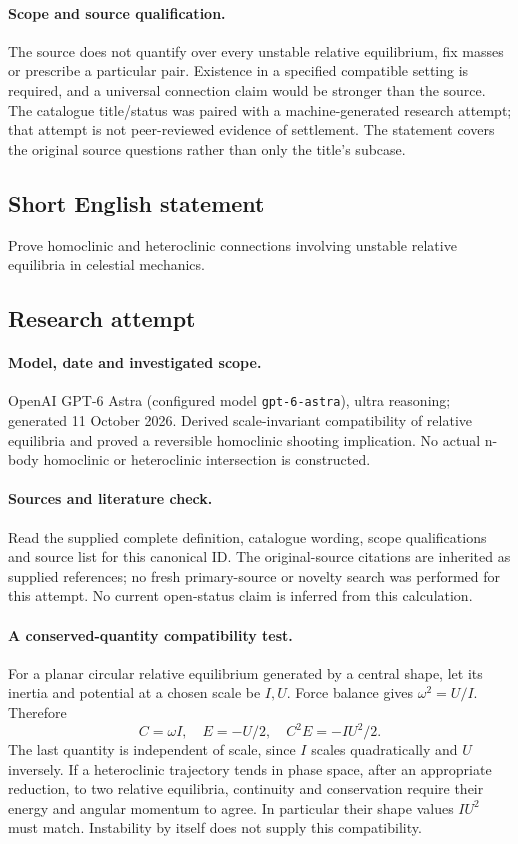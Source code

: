 \documentclass[11pt]{article}
\begin{document}
\paragraph{Scope and source qualification.}The source does not quantify over every unstable relative equilibrium, fix masses or prescribe a particular pair. Existence in a specified compatible setting is required, and a universal connection claim would be stronger than the source. The catalogue title/status was paired with a machine-generated research attempt; that attempt is not peer-reviewed evidence of settlement. The statement covers the original source questions rather than only the title’s subcase.
\subsection{Short English statement}
Prove homoclinic and heteroclinic connections involving unstable relative equilibria in celestial mechanics.
\subsection{Research attempt}
\paragraph{Model, date and investigated scope.}
OpenAI GPT-6 Astra (configured model \texttt{gpt-6-astra}), ultra reasoning; generated 11 October 2026. Derived scale-invariant compatibility of relative equilibria and proved a reversible homoclinic shooting implication. No actual n-body homoclinic or heteroclinic intersection is constructed.

\paragraph{Sources and literature check.}
Read the supplied complete definition, catalogue wording, scope qualifications and source list for this canonical ID. The original-source citations are inherited as supplied references; no fresh primary-source or novelty search was performed for this attempt. No current open-status claim is inferred from this calculation.

\paragraph{A conserved-quantity compatibility test.}For a planar circular relative equilibrium generated by a central shape, let its inertia and potential at a chosen scale be \(I,U\). Force balance gives \(\omega^2=U/I\). Therefore
\[C=\omega I,\quad E=-U/2,\quad C^2E=-IU^2/2.
\]
The last quantity is independent of scale, since \(I\) scales quadratically and \(U\) inversely. If a heteroclinic trajectory tends in phase space, after an appropriate reduction, to two relative equilibria, continuity and conservation require their energy and angular momentum to agree. In particular their shape values \(IU^2\) must match. Instability by itself does not supply this compatibility.
\end{document}
